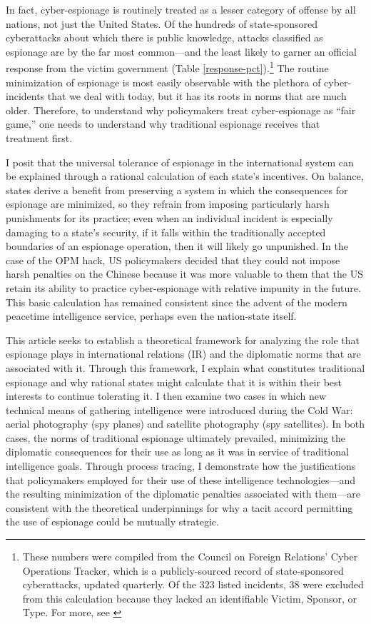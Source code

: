 \documentclass[14pt]{extarticle}
\begin{document}
In fact, cyber-espionage is routinely treated as a lesser category of offense by all nations, not just the United States. Of the hundreds of state-sponsored cyberattacks about which there is public knowledge, attacks classified as espionage are by the far most common---and the least likely to garner an official response from the victim government (Table \ref{response-pct}).\footnote{These numbers were compiled from the Council on Foreign Relations' Cyber Operations Tracker, which is a publicly-sourced record of state-sponsored cyberattacks, updated quarterly. Of the 323 listed incidents, 38 were excluded from this calculation because they lacked an identifiable Victim, Sponsor, or Type. For more, see \cite{council_on_foreign_relations_new_2019}} The routine minimization of espionage is most easily observable with the plethora of cyber-incidents that we deal with today, but it has its roots in norms that are much older. Therefore, to understand why policymakers treat cyber-espionage as \enquote{fair game,} one needs to understand why traditional espionage receives that treatment first.

I posit that the universal tolerance of espionage in the international system can be explained through a rational calculation of each state's incentives. On balance, states derive a benefit from preserving a system in which the consequences for espionage are minimized, so they refrain from imposing particularly harsh punishments for its practice; even when an individual incident is especially damaging to a state's security, if it falls within the traditionally accepted boundaries of an espionage operation, then it will likely go unpunished. In the case of the OPM hack, US policymakers decided that they could not impose harsh penalties on the Chinese because it was more valuable to them that the US retain its ability to practice cyber-espionage with relative impunity in the future. This basic calculation has remained consistent since the advent of the modern peacetime intelligence service, perhaps even the nation-state itself.

This article seeks to establish a theoretical framework for analyzing the role that espionage plays in international relations (IR) and the diplomatic norms that are associated with it. Through this framework, I explain what constitutes traditional espionage and why rational states might calculate that it is within their best interests to continue tolerating it. I then examine two cases in which new technical means of gathering intelligence were introduced during the Cold War: aerial photography (spy planes) and satellite photography (spy satellites). In both cases, the norms of traditional espionage ultimately prevailed, minimizing the diplomatic consequences for their use as long as it was in service of traditional intelligence goals. Through process tracing, I demonstrate how the justifications that policymakers employed for their use of these intelligence technologies---and the resulting minimization of the diplomatic penalties associated with them---are consistent with the theoretical underpinnings for why a tacit accord permitting the use of espionage could be mutually strategic.
\end{document}
